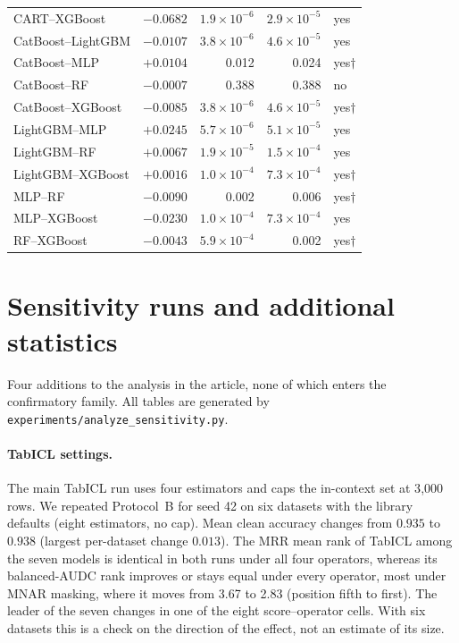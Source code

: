 \documentclass[pdflatex,sn-mathphys]{sn-jnl}
\theoremstyle{thmstyleone}
\begin{document}
{\begin{longtable}{@{}lrrrl@{}}
CART--XGBoost & $-0.0682$ & $1.9\times10^{-6}$ & $2.9\times10^{-5}$ & yes \\
CatBoost--LightGBM & $-0.0107$ & $3.8\times10^{-6}$ & $4.6\times10^{-5}$ & yes \\
CatBoost--MLP & $+0.0104$ & 0.012 & 0.024 & yes$\dagger$ \\
CatBoost--RF & $-0.0007$ & 0.388 & 0.388 & no \\
CatBoost--XGBoost & $-0.0085$ & $3.8\times10^{-6}$ & $4.6\times10^{-5}$ & yes$\dagger$ \\
LightGBM--MLP & $+0.0245$ & $5.7\times10^{-6}$ & $5.1\times10^{-5}$ & yes \\
LightGBM--RF & $+0.0067$ & $1.9\times10^{-5}$ & $1.5\times10^{-4}$ & yes \\
LightGBM--XGBoost & $+0.0016$ & $1.0\times10^{-4}$ & $7.3\times10^{-4}$ & yes$\dagger$ \\
MLP--RF & $-0.0090$ & 0.002 & 0.006 & yes$\dagger$ \\
MLP--XGBoost & $-0.0230$ & $1.0\times10^{-4}$ & $7.3\times10^{-4}$ & yes \\
RF--XGBoost & $-0.0043$ & $5.9\times10^{-4}$ & 0.002 & yes$\dagger$ \\
\bottomrule
\end{longtable}
}

\clearpage
\section{Sensitivity runs and additional statistics}\label{sup:sens}
Four additions to the analysis in the article, none of which enters the confirmatory family. All tables are generated by \texttt{experiments/analyze\_sensitivity.py}.

\paragraph{TabICL settings.} The main TabICL run uses four estimators and caps the in-context set at 3{,}000 rows. We repeated Protocol~B for seed 42 on six datasets with the library defaults (eight estimators, no cap). Mean clean accuracy changes from $0.935$ to $0.938$ (largest per-dataset change $0.013$). The MRR mean rank of TabICL among the seven models is identical in both runs under all four operators, whereas its balanced-AUDC rank improves or stays equal under every operator, most under MNAR masking, where it moves from 3.67 to 2.83 (position fifth to first). The leader of the seven changes in one of the eight score--operator cells. With six datasets this is a check on the direction of the effect, not an estimate of its size.
\end{document}
